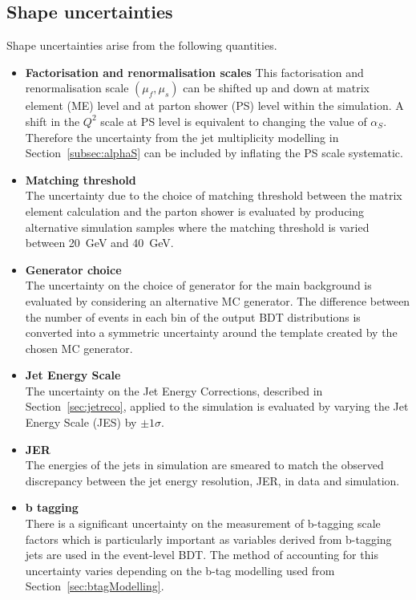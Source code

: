 \subsection{Shape uncertainties}
 Shape uncertainties arise from the following quantities.
\begin{itemize}
\item \textbf{Factorisation and renormalisation scales}
This factorisation and renormalisation scale $\left(\mu_{f},\mu_{s}\right)$ can be shifted up and down at matrix element (ME) level and at parton shower (PS) level within the simulation. A shift in the $Q^{2}$ scale at PS level is equivalent to changing the value of $\alpha_{S}$. Therefore the uncertainty from the jet multiplicity modelling in Section~\ref{subsec:alphaS} can be included by inflating the PS scale systematic.

\item \textbf{Matching threshold}\\
The uncertainty due to the choice of matching threshold between the matrix element calculation and the parton shower is evaluated by producing alternative simulation samples where the matching threshold is varied between 20~GeV and 40~GeV.

\item \textbf{Generator choice}\\
The uncertainty on the choice of generator for the main \ttbar background is evaluated by considering an alternative \ttbar MC generator. The difference between the number of events in each bin of the output BDT distributions is converted into a symmetric uncertainty around the template created by the chosen MC generator.

\item \textbf{Jet Energy Scale}\\
The uncertainty on the Jet Energy Corrections, described in Section~\ref{sec:jetreco}, applied to the simulation is evaluated by varying the Jet Energy Scale (JES) by $\pm 1\sigma$.

\item \textbf{JER}\\
The energies of the jets in simulation are smeared to match the observed discrepancy between the jet energy resolution, JER, in data and simulation. 

\item \textbf{b tagging}\\
There is a significant uncertainty on the measurement of b-tagging scale factors which is particularly important as variables derived from b-tagging jets are used in the event-level BDT. The method of accounting for this uncertainty varies depending on the b-tag modelling used from Section~\ref{sec:btagModelling}.


\end{itemize}
